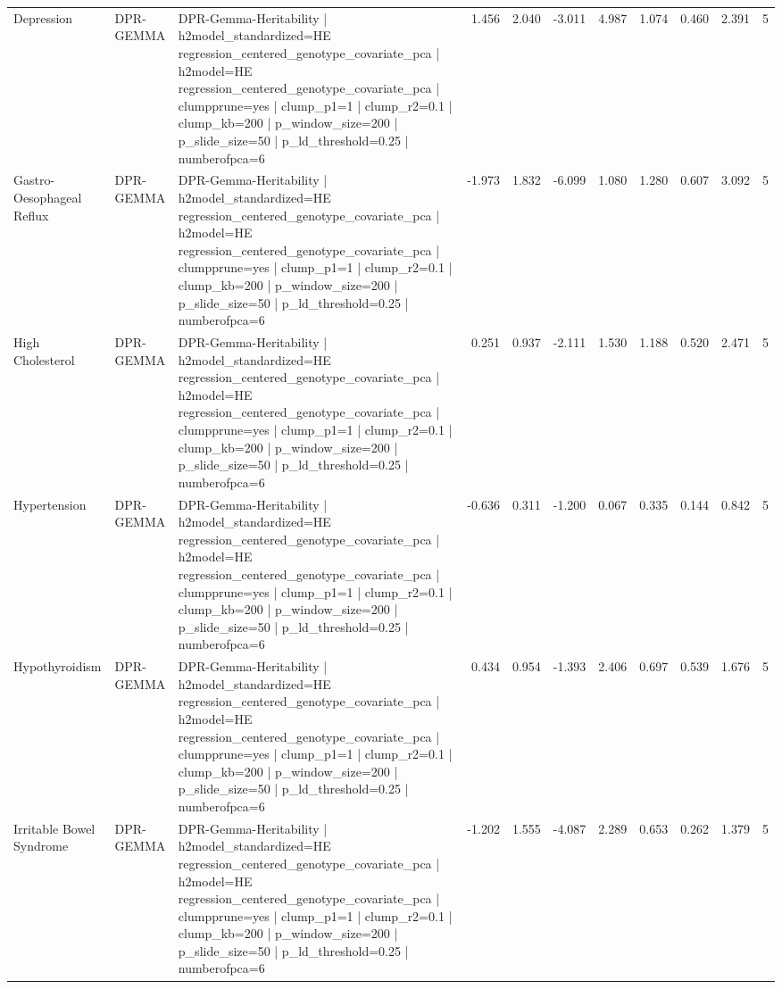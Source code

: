 \begin{landscape}
\begin{longtable}{p{2.4cm}p{1.8cm}p{6.0cm}rrrrrrrr}
Depression & DPR-GEMMA & DPR-Gemma-Heritability | h2model\_standardized=HE regression\_centered\_genotype\_covariate\_pca | h2model=HE regression\_centered\_genotype\_covariate\_pca | clumpprune=yes | clump\_p1=1 | clump\_r2=0.1 | clump\_kb=200 | p\_window\_size=200 | p\_slide\_size=50 | p\_ld\_threshold=0.25 | numberofpca=6 & 1.456 & 2.040 & -3.011 & 4.987 & 1.074 & 0.460 & 2.391 & 5 \\
Gastro-Oesophageal Reflux & DPR-GEMMA & DPR-Gemma-Heritability | h2model\_standardized=HE regression\_centered\_genotype\_covariate\_pca | h2model=HE regression\_centered\_genotype\_covariate\_pca | clumpprune=yes | clump\_p1=1 | clump\_r2=0.1 | clump\_kb=200 | p\_window\_size=200 | p\_slide\_size=50 | p\_ld\_threshold=0.25 | numberofpca=6 & -1.973 & 1.832 & -6.099 & 1.080 & 1.280 & 0.607 & 3.092 & 5 \\
High Cholesterol & DPR-GEMMA & DPR-Gemma-Heritability | h2model\_standardized=HE regression\_centered\_genotype\_covariate\_pca | h2model=HE regression\_centered\_genotype\_covariate\_pca | clumpprune=yes | clump\_p1=1 | clump\_r2=0.1 | clump\_kb=200 | p\_window\_size=200 | p\_slide\_size=50 | p\_ld\_threshold=0.25 | numberofpca=6 & 0.251 & 0.937 & -2.111 & 1.530 & 1.188 & 0.520 & 2.471 & 5 \\
Hypertension & DPR-GEMMA & DPR-Gemma-Heritability | h2model\_standardized=HE regression\_centered\_genotype\_covariate\_pca | h2model=HE regression\_centered\_genotype\_covariate\_pca | clumpprune=yes | clump\_p1=1 | clump\_r2=0.1 | clump\_kb=200 | p\_window\_size=200 | p\_slide\_size=50 | p\_ld\_threshold=0.25 | numberofpca=6 & -0.636 & 0.311 & -1.200 & 0.067 & 0.335 & 0.144 & 0.842 & 5 \\
Hypothyroidism & DPR-GEMMA & DPR-Gemma-Heritability | h2model\_standardized=HE regression\_centered\_genotype\_covariate\_pca | h2model=HE regression\_centered\_genotype\_covariate\_pca | clumpprune=yes | clump\_p1=1 | clump\_r2=0.1 | clump\_kb=200 | p\_window\_size=200 | p\_slide\_size=50 | p\_ld\_threshold=0.25 | numberofpca=6 & 0.434 & 0.954 & -1.393 & 2.406 & 0.697 & 0.539 & 1.676 & 5 \\
Irritable Bowel Syndrome & DPR-GEMMA & DPR-Gemma-Heritability | h2model\_standardized=HE regression\_centered\_genotype\_covariate\_pca | h2model=HE regression\_centered\_genotype\_covariate\_pca | clumpprune=yes | clump\_p1=1 | clump\_r2=0.1 | clump\_kb=200 | p\_window\_size=200 | p\_slide\_size=50 | p\_ld\_threshold=0.25 | numberofpca=6 & -1.202 & 1.555 & -4.087 & 2.289 & 0.653 & 0.262 & 1.379 & 5 \\

\end{longtable}
\end{landscape}
